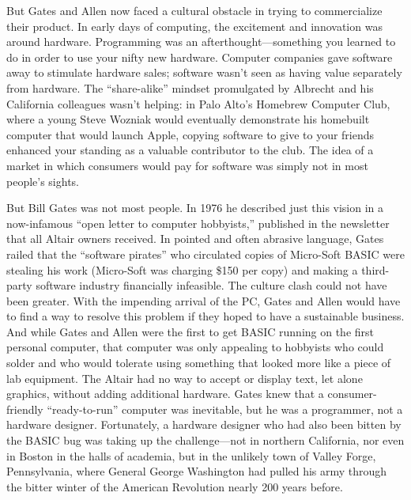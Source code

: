 But Gates and Allen now faced a cultural obstacle in trying to
commercialize their product.
In early days of computing, the excitement and innovation was around
hardware.
Programming was an afterthought---something you learned to do in order
to use your nifty new hardware.
Computer companies gave software away
to stimulate hardware sales; software wasn't seen as having 
value separately from hardware.
The ``share-alike'' mindset promulgated by Albrecht and his California
colleagues wasn't helping: in Palo Alto's Homebrew Computer Club,
where a young Steve Wozniak would eventually demonstrate his homebuilt
computer that would launch Apple, 
copying software to give to your friends
enhanced your standing as a valuable contributor to the club.
The idea of a market in which consumers would pay for software
was simply not in most people's sights.

But Bill Gates was not most people.  In 1976 he described just this
vision in a now-infamous ``open letter
to computer hobbyists,'' published in the newsletter that all
Altair owners received.
In pointed and often abrasive language, Gates railed that the ``software pirates'' who
circulated copies of Micro-Soft BASIC
were stealing his work (Micro-Soft was charging \$150 per copy)
and making a third-party software industry financially
infeasible.
The culture clash could not have been greater.
With the impending arrival of the PC, Gates and Allen would have to
find a way to resolve this problem if they hoped to have a sustainable
business.
And while Gates and Allen were the first to get BASIC running on the first
personal computer, that computer was only appealing to hobbyists
who could solder and who would tolerate using something that looked
more like a piece of lab equipment.
The Altair had no way to accept or display text, let alone graphics,
without adding additional hardware.
Gates knew that a consumer-friendly ``ready-to-run'' computer was inevitable, but he was
a programmer, not a hardware designer.
Fortunately, a hardware designer who had also been bitten by the BASIC
bug was taking up the challenge---not in northern California, nor even
in Boston in the halls of academia, but in the unlikely town of
Valley Forge, Pennsylvania, where General George Washington had pulled
his army through the bitter winter of the American Revolution nearly
200 years before.



